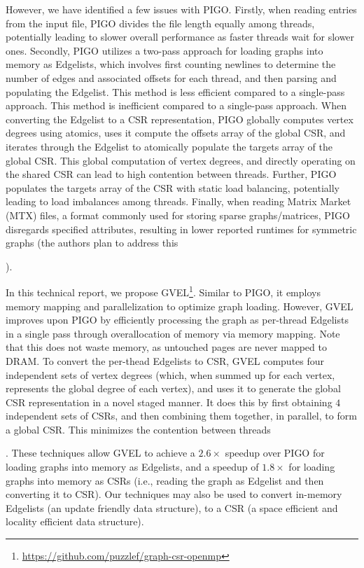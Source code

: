 However, we have identified a few issues with PIGO. Firstly, when reading entries from the input file, PIGO divides the file length equally among threads, potentially leading to slower overall performance as faster threads wait for slower ones. Secondly, PIGO utilizes a two-pass approach for loading graphs into memory as Edgelists, which involves first counting newlines to determine the number of edges and associated offsets for each thread, and then parsing and populating the Edgelist. This method is less efficient compared to a single-pass approach. This method is inefficient compared to a single-pass approach. When converting the Edgelist to a CSR representation, PIGO globally computes vertex degrees using atomics, uses it compute the offsets array of the global CSR, and iterates through the Edgelist to atomically populate the targets array of the global CSR. This global computation of vertex degrees, and directly operating on the shared CSR can lead to high contention between threads. Further, PIGO populates the targets array of the CSR with static load balancing, potentially leading to load imbalances among threads. Finally, when reading Matrix Market (MTX) files, a format commonly used for storing sparse graphs/matrices, PIGO disregards specified attributes, resulting in lower reported runtimes for symmetric graphs (the authors plan to address this).

In this technical report, we propose GVEL\footnote{\url{https://github.com/puzzlef/graph-csr-openmp}}. Similar to PIGO, it employs memory mapping and parallelization to optimize graph loading. However, GVEL improves upon PIGO by efficiently processing the graph as per-thread Edgelists in a single pass through overallocation of memory via memory mapping. Note that this does not waste memory, as untouched pages are never mapped to DRAM. To convert the per-thead Edgelists to CSR, GVEL computes four independent sets of vertex degrees (which, when summed up for each vertex, represents the global degree of each vertex), and uses it to generate the global CSR representation in a novel staged manner. It does this by first obtaining $4$ independent sets of CSRs, and then combining them together, in parallel, to form a global CSR. This minimizes the contention between threads. These techniques allow GVEL to achieve a $2.6\times$ speedup over PIGO for loading graphs into memory as Edgelists, and a speedup of $1.8\times$ for loading graphs into memory as CSRs (i.e., reading the graph as Edgelist and then converting it to CSR). Our techniques may also be used to convert in-memory Edgelists (an update friendly data structure), to a CSR (a space efficient and locality efficient data structure).




